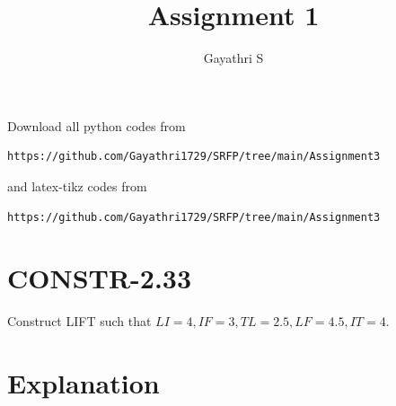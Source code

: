 \documentclass[journal,12pt,twocolumn]{IEEEtran}
\begin{document}
     \def\rightbox#1{\makebox[0in][r]{#1}}
     \def\centbox#1{\makebox[0in]{#1}}
     \def\topbox#1{\raisebox{-\baselineskip}[0in][0in]{#1}}
     \def\midbox#1{\raisebox{-0.5\baselineskip}[0in][0in]{#1}}
%
\title{Assignment 1} 
\author{Gayathri S}
\maketitle
\newpage
\bigskip
\renewcommand{\thefigure}{\theenumi}
\renewcommand{\thetable}{\theenumi}
Download all python codes from 
\begin{lstlisting}
https://github.com/Gayathri1729/SRFP/tree/main/Assignment3
\end{lstlisting}
%
and latex-tikz codes from 
%
\begin{lstlisting}
https://github.com/Gayathri1729/SRFP/tree/main/Assignment3
\end{lstlisting}
%
\section{CONSTR-2.33}
Construct LIFT such that $LI =4,IF =3,TL =2.5,LF =4.5,IT =4$.
\section{Explanation}
\end{document}
